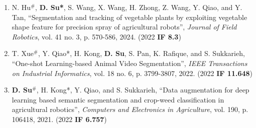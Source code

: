 \documentclass[margin,line]{res}
\begin{document}
\begin{resume}
\begin{enumerate}

\item N. Hu$^{\#}$,  \textbf{D. Su*}, S. Wang, X. Wang, H. Zhong, Z. Wang, Y. Qiao, and Y. Tan, ``Segmentation and tracking of vegetable plants by exploiting vegetable shape feature for precision spray of agricultural robots'', {\it Journal of Field Robotics}, vol. 41 no. 3, p. 570-586, 2024. (2022 \textbf{IF 8.3})

\item T. Xue$^{\#}$, Y. Qiao*, H. Kong, \textbf{D. Su}, S. Pan, K. Rafique, and S. Sukkarieh, ``One-shot Learning-based Animal Video Segmentation'', {\it IEEE Transactions on Industrial Informatics}, vol. 18 no. 6, p. 3799-3807, 2022. (2022 \textbf{IF 11.648})




\item \textbf{D. Su}$^{\#}$, H. Kong*, Y. Qiao, and S. Sukkarieh, ``Data augmentation for deep learning based semantic segmentation and crop-weed classification in agricultural robotics'', {\it Computers and Electronics in Agriculture}, vol. 190, p. 106418, 2021. (2022 \textbf{IF 6.757})


\end{enumerate}
\end{resume}
\end{document}
